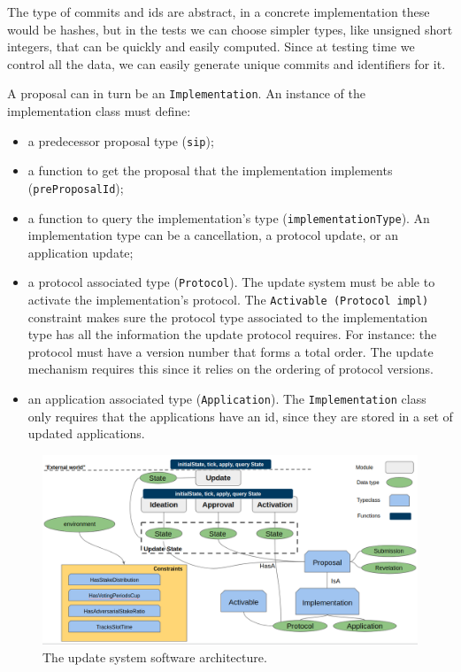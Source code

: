 The type of commits and ids are abstract, in a concrete implementation these
would be hashes, but in the tests we can choose simpler types, like unsigned
short integers, that can be quickly and easily computed. Since at testing time
we control all the data, we can easily generate unique commits and identifiers
for it.

A proposal can in turn be an \texttt{Implementation}. An instance of the
implementation class must define:
\begin{itemize}
	\item a predecessor proposal type (\texttt{sip});
	\item a function to get the proposal that the implementation implements
	(\texttt{preProposalId});
	\item a function to query the implementation's type
	(\texttt{implementationType}). An implementation type can be a cancellation,
	a protocol update, or an application update;
	\item a protocol associated type (\texttt{Protocol}). The update system
	must be
	able to activate the implementation's protocol. The \texttt{Activable
		(Protocol impl)} constraint makes sure the protocol type associated to
		the
	implementation type has all the information the update protocol requires.
	For
	instance: the protocol must have a version number that forms a total order.
	The update mechanism requires this since it relies on the ordering of
	protocol versions.
	\item an application associated type (\texttt{Application}). The
	\texttt{Implementation} class only requires that the applications have an
	id,
	since they are stored in a set of updated applications.
\end{itemize}

\begin{figure}[h!] %
	\centering
	\includegraphics[width=0.8\columnwidth,
	keepaspectratio]{figures/update-system-sw-architecture.png}
	\caption{The update system software architecture.}
	\label{fig:upd-system-sw-architecture}
\end{figure}


